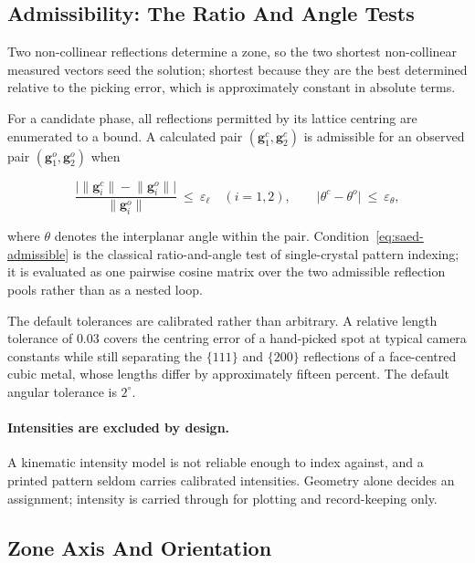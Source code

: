 \subsection{Admissibility: The Ratio And Angle Tests}

Two non-collinear reflections determine a zone, so the two shortest non-collinear measured
vectors seed the solution; shortest because they are the best determined relative to the picking
error, which is approximately constant in absolute terms.

For a candidate phase, all reflections permitted by its lattice centring are enumerated to a
bound. A calculated pair $\left(\mathbf{g}^{c}_{1}, \mathbf{g}^{c}_{2}\right)$ is admissible for
an observed pair $\left(\mathbf{g}^{o}_{1}, \mathbf{g}^{o}_{2}\right)$ when

\begin{equation}
\frac{\bigl| \lVert \mathbf{g}^{c}_{i} \rVert
- \lVert \mathbf{g}^{o}_{i} \rVert \bigr|}{\lVert \mathbf{g}^{o}_{i} \rVert}
\ \le\ \varepsilon_{\ell}
\quad (i = 1,2),
\qquad
\bigl| \theta^{c} - \theta^{o} \bigr| \ \le\ \varepsilon_{\theta},
\label{eq:saed-admissible}
\end{equation}

where $\theta$ denotes the interplanar angle within the pair. Condition~\eqref{eq:saed-admissible}
is the classical ratio-and-angle test of single-crystal pattern indexing; it is evaluated as one
pairwise cosine matrix over the two admissible reflection pools rather than as a nested loop.

The default tolerances are calibrated rather than arbitrary. A relative length tolerance of
$0.03$ covers the centring error of a hand-picked spot at typical camera constants while still
separating the $\{111\}$ and $\{200\}$ reflections of a face-centred cubic metal, whose lengths
differ by approximately fifteen percent. The default angular tolerance is $2^{\circ}$.

\paragraph{Intensities are excluded by design.} A kinematic intensity model is not reliable enough
to index against, and a printed pattern seldom carries calibrated intensities. Geometry alone
decides an assignment; intensity is carried through for plotting and record-keeping only.

\subsection{Zone Axis And Orientation}

